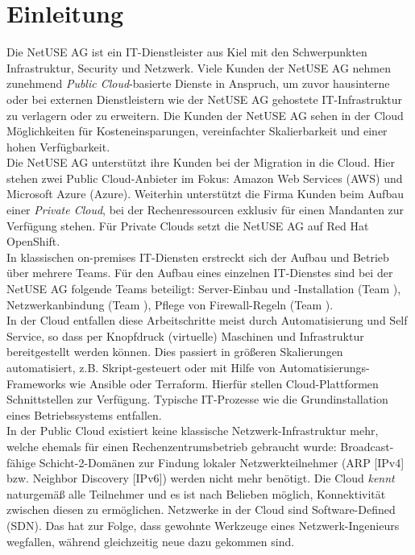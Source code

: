 \chapter{Einleitung}

Die NetUSE AG ist ein IT-Dienstleister aus Kiel mit den Schwerpunkten Infrastruktur, Security und Netzwerk. Viele Kunden der NetUSE AG nehmen zunehmend \textit{Public Cloud}-basierte Dienste in Anspruch, um zuvor hausinterne oder bei externen Dienstleistern wie der NetUSE AG gehostete IT-Infrastruktur zu verlagern oder zu erweitern. Die Kunden der NetUSE AG sehen in der Cloud Möglichkeiten für Kosteneinsparungen, vereinfachter Skalierbarkeit und einer hohen Verfügbarkeit.\\
Die NetUSE AG unterstützt ihre Kunden bei der Migration in die Cloud. Hier stehen zwei Public Cloud-Anbieter im Fokus: Amazon Web Services (AWS) und Microsoft Azure (Azure). Weiterhin unterstützt die Firma Kunden beim Aufbau einer \textit{Private Cloud}, bei der Rechenressourcen exklusiv für einen Mandanten zur Verfügung stehen. Für Private Clouds setzt die NetUSE AG auf Red Hat OpenShift.\\
In klassischen \gls{on-premises} IT-Diensten erstreckt sich der Aufbau und Betrieb über mehrere Teams. Für den Aufbau eines einzelnen IT-Dienstes sind bei der NetUSE AG folgende Teams beteiligt: Server-Einbau und -Installation (Team \grqq{}), Netzwerkanbindung (Team \grqq{}), Pflege von Firewall-Regeln (Team \grqq{}).\\
In der Cloud entfallen diese Arbeitschritte meist durch Automatisierung und Self Service, so dass per Knopfdruck (virtuelle) Maschinen und Infrastruktur bereitgestellt werden können\cite{Karlstetter2017a}. Dies passiert in größeren Skalierungen automatisiert, z.B. Skript-gesteuert oder mit Hilfe von Automatisierungs-Frameworks wie Ansible oder Terraform. Hierfür stellen Cloud-Plattformen Schnittstellen zur Verfügung\cite{edelman2018}\cite{Brikman2019}. Typische IT-Prozesse wie die Grundinstallation eines Betriebssystems entfallen.\\
In der Public Cloud existiert keine klassische Netzwerk-Infrastruktur mehr, welche ehemals für einen Rechenzentrumsbetrieb gebraucht wurde: Broadcast-fähige Schicht-2-Domänen zur Findung lokaler Netzwerkteilnehmer (ARP [IPv4] bzw. Neighbor Discovery [IPv6]) werden nicht mehr benötigt. Die Cloud \textit{kennt} naturgemäß alle Teilnehmer und es ist nach Belieben möglich, Konnektivität zwischen diesen zu ermöglichen. Netzwerke in der Cloud sind Software-Defined (SDN)\cite{Seidel2015}. Das hat zur Folge, dass gewohnte Werkzeuge eines Netzwerk-Ingenieurs wegfallen, während gleichzeitig neue dazu gekommen sind.


